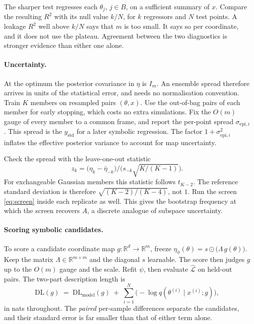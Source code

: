 \documentclass[11pt, letterpaper]{article}
\theoremstyle{definition}
\begin{document}
The sharper test regresses each $\theta_j$, $j\in B$, on a sufficient summary of
$x$. Compare the resulting $R^2$ with its null value $k/N$, for $k$ regressors
and $N$ test points. A leakage $R^2$ well above $k/N$ says that $m$ is too
small. It says so per coordinate, and it does not use the plateau. Agreement
between the two diagnostics is stronger evidence than either one alone.

\paragraph{Uncertainty.}
At the optimum the posterior covariance in $\eta$ is $I_m$. An ensemble spread
therefore arrives in units of the statistical error, and needs no normalisation
convention. Train $K$ members on resampled pairs $(\theta,x)$. Use the
out-of-bag pairs of each member for early stopping, which costs no extra
simulations. Fix the $O(m)$ gauge of every member to a common frame, and report
the per-point spread $\sigma_{\mathrm{epi},i}$. This spread is the
$y_{\mathrm{std}}$ for a later symbolic regression. The factor
$1+\sigma_{\mathrm{epi},i}^2$ inflates the effective posterior variance to
account for map uncertainty.

Check the spread with the leave-one-out statistic
\[
  z_k=\bigl(\eta_k-\bar\eta_{-k}\bigr)\big/\bigl(s_{-k}\sqrt{K/(K-1)}\bigr) .
\]
For exchangeable
Gaussian members this statistic follows $t_{K-2}$. The reference standard
deviation is therefore $\sqrt{(K-2)/(K-4)}$, not $1$. Run the screen
\eqref{eq:screen} inside each replicate as well. This gives the bootstrap
frequency at which the screen recovers $A$, a discrete analogue of subspace
uncertainty.

\paragraph{Scoring symbolic candidates.}
To score a candidate coordinate map $g:\mathbb{R}^d\to\mathbb{R}^{m}$, freeze
$\eta_\phi(\theta)=s\odot\bigl(\Lambda\,g(\theta)\bigr)$. Keep the matrix
$\Lambda\in\mathbb{R}^{m\times m}$ and the diagonal $s$ learnable. The score
then judges $g$ up to the $O(m)$ gauge and the scale. Refit $\psi$, then
evaluate
$\hat{\mathcal{L}}$ on held-out pairs. The two-part description length is
\begin{equation}
  \mathrm{DL}(g) \;=\; \mathrm{DL}_{\mathrm{model}}(g)
  \;+\;\sum_{i=1}^{N}\bigl(-\log q(\theta^{(i)}\mid x^{(i)};g)\bigr),
  \label{eq:mdl}
\end{equation}
in nats throughout. The \emph{paired} per-sample differences separate the
candidates, and their standard error is far smaller than that of either term
alone.
\end{document}
